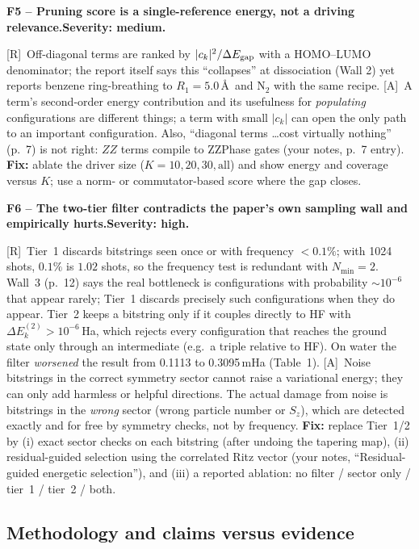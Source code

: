 \documentclass[11pt,a4paper]{article}
\newcommand{\lR}{\textcolor{keyblue}{[R]}}   %
\newcommand{\lA}{\textcolor{notegray}{[A]}}  %
\newcommand{\sev}[1]{\textbf{Severity: #1.}}
\newcommand{\flaw}[4]{\par\medskip\noindent\textbf{#1 -- #2.}\quad{\small\textcolor{notegray}{Where: #3.}}\quad\sev{#4}\par\nobreak}
\begin{document}
\flaw{F5}{Pruning score is a single-reference energy, not a driving relevance}{p.~7, Eqs.~(24)--(26); p.~12, Eq.~(37)}{medium}
\lR\ Off-diagonal terms are ranked by $|c_k|^2/\Delta E_{\rm gap}$ with a HOMO--LUMO denominator; the report itself says this ``collapses'' at dissociation (Wall 2) yet reports benzene ring-breathing to $R_1=5.0$\,\AA\ and N$_2$ with the same recipe. \lA\ A term's second-order energy contribution and its usefulness for \emph{populating} configurations are different things; a term with small $|c_k|$ can open the only path to an important configuration. Also, ``diagonal terms \ldots cost virtually nothing'' (p.~7) is not right: $ZZ$ terms compile to ZZPhase gates (your notes, p.~7 entry). \textbf{Fix:} ablate the driver size ($K=10,20,30,\text{all}$) and show energy and coverage versus $K$; use a norm- or commutator-based score where the gap closes.

\flaw{F6}{The two-tier filter contradicts the paper's own sampling wall and empirically hurts}{p.~9, Eqs.~(35)--(36); p.~10; p.~12, Wall 3}{high}
\lR\ Tier~1 discards bitstrings seen once or with frequency $<0.1\%$; with 1024 shots, $0.1\%$ is $1.02$ shots, so the frequency test is redundant with $N_{\min}=2$. Wall~3 (p.~12) says the real bottleneck is configurations with probability $\sim10^{-6}$ that appear rarely; Tier~1 discards precisely such configurations when they do appear. Tier~2 keeps a bitstring only if it couples directly to HF with $\Delta E^{(2)}_k>10^{-6}$\,Ha, which rejects every configuration that reaches the ground state only through an intermediate (e.g.\ a triple relative to HF). On water the filter \emph{worsened} the result from 0.1113 to 0.3095\,mHa (Table~1). \lA\ Noise bitstrings in the correct symmetry sector cannot raise a variational energy; they can only add harmless or helpful directions. The actual damage from noise is bitstrings in the \emph{wrong} sector (wrong particle number or $S_z$), which are detected exactly and for free by symmetry checks, not by frequency. \textbf{Fix:} replace Tier~1/2 by (i) exact sector checks on each bitstring (after undoing the tapering map), (ii) residual-guided selection using the correlated Ritz vector (your notes, ``Residual-guided energetic selection''), and (iii) a reported ablation: no filter / sector only / tier~1 / tier~2 / both.

\subsection{Methodology and claims versus evidence}
\end{document}
